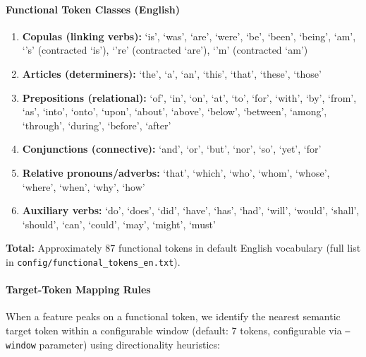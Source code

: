 \paragraph{Functional Token Classes (English)}
\begin{enumerate}
  \item \textbf{Copulas (linking verbs):} `is', `was', `are', `were', `be', `been', `being', `am', `'s' (contracted `is'), `'re' (contracted `are'), `'m' (contracted `am')

  \item \textbf{Articles (determiners):} `the', `a', `an', `this', `that', `these', `those'

  \item \textbf{Prepositions (relational):} `of', `in', `on', `at', `to', `for', `with', `by', `from', `as', `into', `onto', `upon', `about', `above', `below', `between', `among', `through', `during', `before', `after'

  \item \textbf{Conjunctions (connective):} `and', `or', `but', `nor', `so', `yet', `for'

  \item \textbf{Relative pronouns/adverbs:} `that', `which', `who', `whom', `whose', `where', `when', `why', `how'

  \item \textbf{Auxiliary verbs:} `do', `does', `did', `have', `has', `had', `will', `would', `shall', `should', `can', `could', `may', `might', `must'
\end{enumerate}

\textbf{Total:} Approximately 87 functional tokens in default English vocabulary (full list in \texttt{config/functional\_tokens\_en.txt}).

\paragraph{Target-Token Mapping Rules}
When a feature peaks on a functional token, we identify the nearest semantic target token within a configurable window (default: 7 tokens, configurable via \texttt{--window} parameter) using directionality heuristics:

